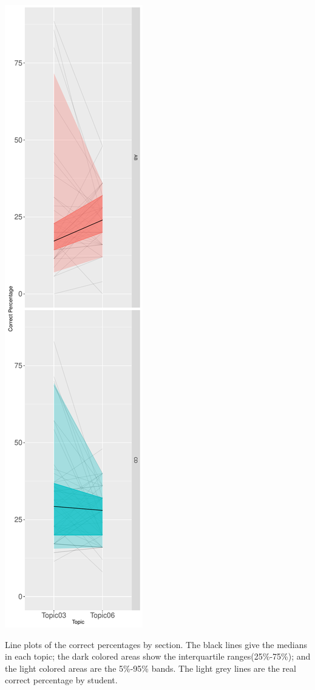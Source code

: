 \documentclass[12pt,nohyper]{tufte-handout}\usepackage[]{graphicx}\usepackage[]{color}
\begin{document}
\begin{marginfigure}\includegraphics[width=0.95\linewidth]{Stat101_allSections_lineplot}
\caption{\label{mar:line}Line plots of the correct percentages by section.
The black lines give the medians in each topic;
the dark colored areas show the interquartile ranges(25\%-75\%);
and the light colored areas are the 5\%-95\% bands.
The light grey lines are the real correct percentage by student.}
\end{marginfigure}%
\end{document}
